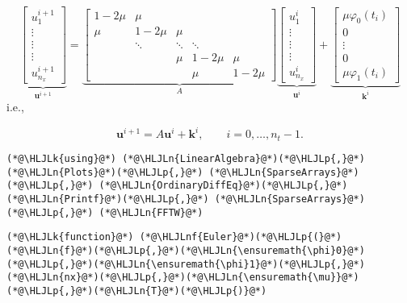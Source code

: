 \documentclass[12pt,landscape]{article}
\newcommand{\HLJLk}[1]{\textcolor[RGB]{148,91,176}{\textbf{#1}}}
\newcommand{\HLJLn}[1]{#1}
\newcommand{\HLJLnf}[1]{\textcolor[RGB]{66,102,213}{#1}}
\newcommand{\HLJLp}[1]{#1}
\begin{document}
{\[
\underbrace{\begin{bmatrix}
u^{i+1}_{1} \\
\vdots \\
\vdots \\
\vdots \\
u^{i+1}_{n_x}
\end{bmatrix}}_{\mathbf{u}^{i+1}} = 
\underbrace{\begin{bmatrix}
1 - 2\mu & \mu & & & \\
\mu  & 1-2\mu & \mu  & & \\
      & \ddots & \ddots & \ddots & \\
      &        & \mu    & 1- 2\mu & \mu \\
      &        &        &\mu      & 1-2\mu
\end{bmatrix}}_{A}
\underbrace{\begin{bmatrix}
u^{i}_{1} \\
\vdots \\
\vdots \\
\vdots \\
u^{i}_{n_x}
\end{bmatrix}}_{\mathbf{u}^i}
+
\underbrace{\begin{bmatrix}
\mu\varphi_0(t_i) \\
0 \\
\vdots \\
0 \\
\mu \varphi_1(t_i)
\end{bmatrix}}_{\mathbf{k}^i}
\]
i.e., 

\[
\mathbf{u}^{i+1} = A\mathbf{u}^i + \mathbf{k}^i, \qquad i = 0, \ldots, n_t-1.
\]

\begin{lstlisting}
(*@\HLJLk{using}@*) (*@\HLJLn{LinearAlgebra}@*)(*@\HLJLp{,}@*) (*@\HLJLn{Plots}@*)(*@\HLJLp{,}@*) (*@\HLJLn{SparseArrays}@*)(*@\HLJLp{,}@*) (*@\HLJLn{OrdinaryDiffEq}@*)(*@\HLJLp{,}@*) (*@\HLJLn{Printf}@*)(*@\HLJLp{,}@*) (*@\HLJLn{SparseArrays}@*)(*@\HLJLp{,}@*) (*@\HLJLn{FFTW}@*)
\end{lstlisting}


\begin{lstlisting}
(*@\HLJLk{function}@*) (*@\HLJLnf{Euler}@*)(*@\HLJLp{(}@*)(*@\HLJLn{f}@*)(*@\HLJLp{,}@*)(*@\HLJLn{\ensuremath{\phi}0}@*)(*@\HLJLp{,}@*)(*@\HLJLn{\ensuremath{\phi}1}@*)(*@\HLJLp{,}@*)(*@\HLJLn{nx}@*)(*@\HLJLp{,}@*)(*@\HLJLn{\ensuremath{\mu}}@*)(*@\HLJLp{,}@*)(*@\HLJLn{T}@*)(*@\HLJLp{)}@*)
    

\end{lstlisting}}
\end{document}
